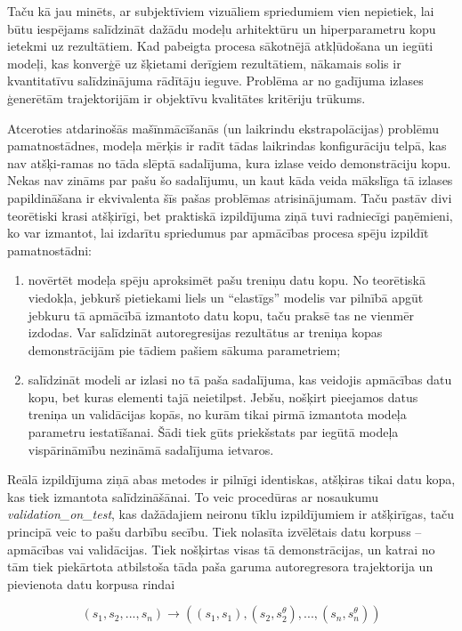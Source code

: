 \documentclass[12pt, a4paper]{article}
\numberwithin{equation}{section} %
\begin{document}
Taču kā jau minēts, ar subjektīviem vizuāliem spriedumiem vien nepietiek, lai būtu iespējams salīdzināt dažādu modeļu arhitektūru un hiperparametru kopu ietekmi uz rezultātiem. Kad pabeigta procesa sākotnējā atkļūdošana un iegūti modeļi, kas konverģē uz šķietami derīgiem rezultātiem, nākamais solis ir kvantitatīvu salīdzinājuma rādītāju ieguve. Problēma ar no gadījuma izlases ģenerētām trajektorijām ir objektīvu kvalitātes kritēriju trūkums. 

Atceroties atdarinošās mašīnmācīšanās (un laikrindu ekstrapolācijas) problēmu pamatnostādnes, modeļa mērķis ir radīt tādas laikrindas konfigurāciju telpā, kas nav atšķi-ramas no tāda slēptā sadalījuma, kura izlase veido demonstrāciju kopu. Nekas nav zināms par pašu šo sadalījumu, un kaut kāda veida mākslīga tā izlases papildināšana ir ekvivalenta šīs pašas problēmas atrisinājumam. Taču pastāv divi teorētiski krasi atšķirīgi, bet praktiskā izpildījuma ziņā tuvi radniecīgi paņēmieni, ko var izmantot, lai izdarītu spriedumus par apmācības procesa spēju izpildīt pamatnostādni:

\begin{enumerate}
    \item novērtēt modeļa spēju aproksimēt pašu treniņu datu kopu. No teorētiskā viedokļa, jebkurš pietiekami liels un ``elastīgs'' modelis var pilnībā apgūt jebkuru tā apmācībā izmantoto datu kopu, taču praksē tas ne vienmēr izdodas. Var salīdzināt autoregresijas rezultātus ar treniņa kopas demonstrācijām pie tādiem pašiem sākuma parametriem;
    \item salīdzināt modeli ar izlasi no tā paša sadalījuma, kas veidojis apmācības datu kopu, bet kuras elementi tajā neietilpst. Jebšu, nošķirt pieejamos datus treniņa un validācijas kopās, no kurām tikai pirmā izmantota modeļa parametru iestatīšanai. Šādi tiek gūts priekšstats par iegūtā modeļa vispārināmību nezināmā sadalījuma ietvaros.
\end{enumerate}

Reālā izpildījuma ziņā abas metodes ir pilnīgi identiskas, atšķiras tikai datu kopa, kas tiek izmantota salīdzināšānai. To veic procedūras ar nosaukumu \textit{validation\_on\_test}, kas dažādajiem neironu tīklu izpildījumiem ir atšķirīgas, taču principā veic to pašu darbību secību. Tiek nolasīta izvēlētais datu korpuss -- apmācības vai validācijas. Tiek nošķirtas visas tā demonstrācijas, un katrai no tām tiek piekārtota atbilstoša tāda paša garuma autoregresora trajektorija un pievienota datu korpusa rindai

\begin{equation}
    (s_1, s_2, ..., s_n) \rightarrow \left ( (s_1, s_1), (s_2, s^{\theta}_2), ...,      (s_n, s^{\theta}_n) \right )
\end{equation}
\end{document}
